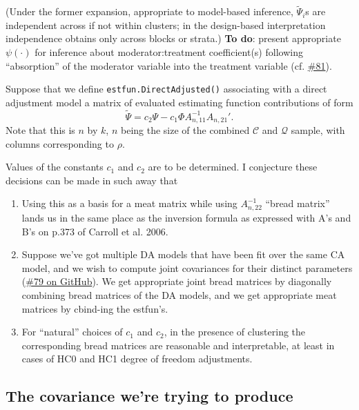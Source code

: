 \documentclass{article}
\begin{document}
(Under the former expansion, appropriate to model-based inference,
$\tilde{\Psi}_{i}$s are independent across if not within
clusters; in the design-based interpretation independence obtains only across blocks or
strata.)  \textbf{To do}: present appropriate $\psi(\cdot)$ for inference
about moderator:treatment coefficient(s) following ``absorption'' of the moderator
variable into the treatment variable (cf. \href{https://github.com/benbhansen-stats/flexida/issues/81#issuecomment-1282944562}{\#81}).
      
       Suppose that we define \texttt{estfun.DirectAdjusted()} associating
with a direct adjustment model a matrix of evaluated estimating function
contributions of form
\begin{equation*}
  \tilde{\Psi} = c_{2}\Psi - c_{1}\Phi A_{n,11}^{-1}A_{n,21}'.
\end{equation*}
Note that this is $n$ by
$k$, $n$ being the size of the combined $\mathcal{C}$ and
$\mathcal{Q}$ sample, with columns corresponding to $\rho$.

Values of the constants $c_{1}$ and $c_{2}$ are to be determined.
I conjecture these decisions can be made in such away that 
\begin{enumerate}
\item Using this as a basis for a meat matrix while using
  $A_{n,22}^{-1}$  ``bread matrix'' lands us in the same place as the
  inversion formula as expressed with A's and B's on p.373 of Carroll
  et al. 2006.
\item Suppose we've got multiple DA models that have been fit over the
  same CA model, and we wish to compute joint covariances for their
  distinct parameters
  (\href{https://github.com/benbhansen-stats/flexida/issues/79}{\#79
    on GitHub}). We get appropriate joint bread matrices by
  diagonally combining bread matrices of the DA models, and we get
  appropriate meat matrices by cbind-ing the estfun's.
\item For ``natural'' choices of $c_{1}$ and $c_{2}$, in the
  presence of clustering the corresponding bread matrices are
  reasonable and interpretable, at least in cases of HC0 and HC1
  degree of freedom adjustments. 
\end{enumerate}

\subsection{The covariance we're trying to produce}
\end{document}
